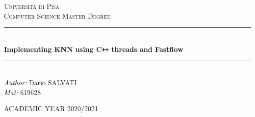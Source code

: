 
\begin{titlepage}

\newcommand{\HRule}{\rule{\linewidth}{0.5mm}} %

\center %
 

\textsc{\LARGE Università di Pisa}\\[1.5cm] %
\textsc{\Large Computer Science Master Degree}\\[0.5cm] %


\HRule \\[0.75cm]
{ \huge \bfseries Implementing KNN using C\verb!++! threads and Fastflow}\\[0.4cm] %
\HRule \\[1.5cm]
 

\large
\emph{Author:} Dario \textsc{SALVATI} \\
\emph{Mat:} 619628

\vspace{2cm}



{\large ACADEMIC YEAR 2020/2021}\\[2cm] %


\end{titlepage}
